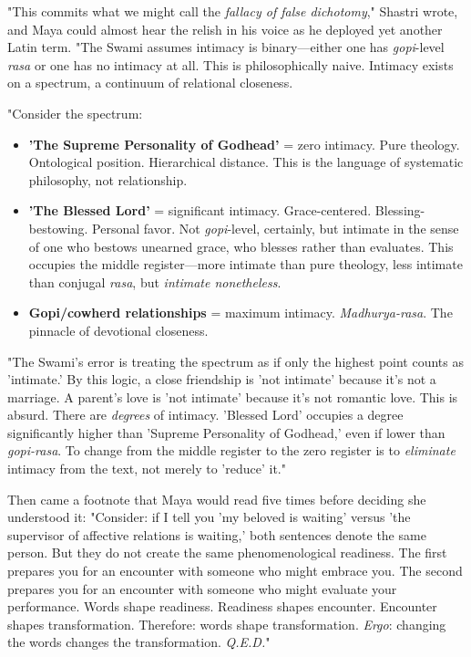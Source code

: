 \documentclass[12pt,twoside]{book}
\begin{document}
"This commits what we might call the \emph{fallacy of false dichotomy}," Shastri wrote, and Maya could almost hear the relish in his voice as he deployed yet another Latin term. "The Swami assumes intimacy is binary—either one has \emph{gopi}-level \emph{rasa} or one has no intimacy at all. This is philosophically naive. Intimacy exists on a spectrum, a continuum of relational closeness.

"Consider the spectrum:

\begin{itemize}
\item \textbf{\textbf{'The Supreme Personality of Godhead'}} = zero intimacy. Pure theology. Ontological position. Hierarchical distance. This is the language of systematic philosophy, not relationship.

\item \textbf{\textbf{'The Blessed Lord'}} = significant intimacy. Grace-centered. Blessing-bestowing. Personal favor. Not \emph{gopi}-level, certainly, but intimate in the sense of one who bestows unearned grace, who blesses rather than evaluates. This occupies the middle register—more intimate than pure theology, less intimate than conjugal \emph{rasa}, but \emph{intimate nonetheless}.

\item \textbf{\textbf{Gopi/cowherd relationships}} = maximum intimacy. \emph{Madhurya-rasa}. The pinnacle of devotional closeness.
\end{itemize}

"The Swami's error is treating the spectrum as if only the highest point counts as 'intimate.' By this logic, a close friendship is 'not intimate' because it's not a marriage. A parent's love is 'not intimate' because it's not romantic love. This is absurd. There are \emph{degrees} of intimacy. 'Blessed Lord' occupies a degree significantly higher than 'Supreme Personality of Godhead,' even if lower than \emph{gopi-rasa}. To change from the middle register to the zero register is to \emph{eliminate} intimacy from the text, not merely to 'reduce' it."

Then came a footnote that Maya would read five times before deciding she understood it: "Consider: if I tell you 'my beloved is waiting' versus 'the supervisor of affective relations is waiting,' both sentences denote the same person. But they do not create the same phenomenological readiness. The first prepares you for an encounter with someone who might embrace you. The second prepares you for an encounter with someone who might evaluate your performance. Words shape readiness. Readiness shapes encounter. Encounter shapes transformation. Therefore: words shape transformation. \emph{Ergo}: changing the words changes the transformation. \emph{Q.E.D.}"
\end{document}
